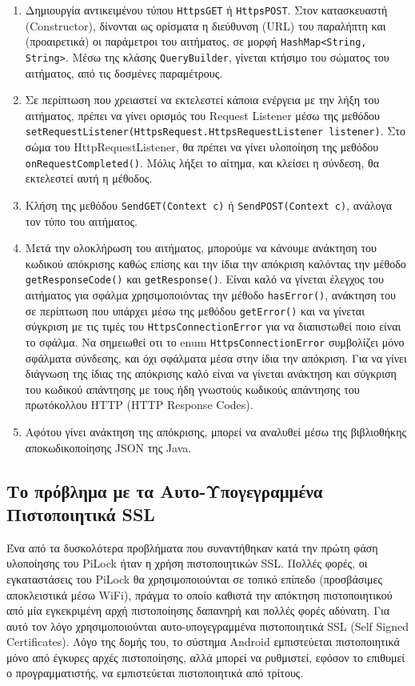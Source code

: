 	\begin{enumerate}
		\item Δημιουργία αντικειμένου τύπου \verb|HttpsGET| ή \verb|HttpsPOST|. Στον κατασκευαστή (Constructor), δίνονται ως ορίσματα η διεύθυνση (URL) του παραλήπτη και (προαιρετικά) οι παράμετροι του αιτήματος, σε μορφή \verb|HashMap<String, String>|. Μέσω της κλάσης \verb|QueryBuilder|, γίνεται κτήσιμο του σώματος του αιτήματος, από τις δοσμένες παραμέτρους.
		\item Σε περίπτωση που χρειαστεί να εκτελεστεί κάποια ενέργεια με την λήξη του αιτήματος, πρέπει να γίνει ορισμός του Request Listener μέσω της μεθόδου \verb|setRequestListener(HttpsRequest.HttpsRequestListener listener)|. Στο σώμα του HttpRequestListener, θα πρέπει να γίνει υλοποίηση της μεθόδου \verb|onRequestCompleted()|. Μόλις λήξει το αίτημα, και κλείσει η σύνδεση, θα εκτελεστεί αυτή η μέθοδος.
		\item Κλήση της μεθόδου \verb|SendGET(Context c)| ή \verb|SendPOST(Context c)|, ανάλογα τον τύπο του αιτήματος.
		\item Μετά την ολοκλήρωση του αιτήματος, μπορούμε να κάνουμε ανάκτηση του κωδικού απόκρισης καθώς επίσης και την ίδια την απόκριση καλόντας την μέθοδο \verb|getResponseCode()| και \verb|getResponse()|. Είναι καλό να γίνεται έλεγχος του αιτήματος για σφάλμα χρησιμοποιόντας την μέθοδο \verb|hasError()|, ανάκτηση του σε περίπτωση που υπάρχει μέσω της μεθόδου \verb|getError()| και να γίνεται σύγκριση με τις τιμές του \verb|HttpsConnectionError| για να διαπιστωθεί ποιο είναι το σφάλμα. Να σημειωθεί οτι το enum \verb|HttpsConnectionError| συμβολίζει μόνο σφάλματα σύνδεσης, και όχι σφάλματα μέσα στην ίδια την απόκριση. Για να γίνει διάγνωση της ίδιας της απόκρισης καλό είναι να γίνεται ανάκτηση και σύγκριση του κωδικού απάντησης με τους ήδη γνωστούς κωδικούς απάντησης του πρωτόκολλου HTTP (HTTP Response Codes).
		\item Αφότου γίνει ανάκτηση της απόκρισης, μπορεί να αναλυθεί μέσω της βιβλιοθήκης αποκωδικοποίησης JSON της Java.
	\end{enumerate}

	\subsection{Το πρόβλημα με τα Αυτο-Υπογεγραμμένα Πιστοποιητικά SSL}
		Ένα από τα δυσκολότερα προβλήματα που συναντήθηκαν κατά την πρώτη φάση υλοποίησης του PiLock ήταν η χρήση πιστοποιητικών SSL. Πολλές φορές, οι εγκαταστάσεις του PiLock θα χρησιμοποιούνται σε τοπικό επίπεδο (προσβάσιμες αποκλειστικά μέσω WiFi), πράγμα το οποίο καθιστά την απόκτηση πιστοποιητικού από μία εγκεκριμένη αρχή πιστοποίησης δαπανηρή και πολλές φορές αδύνατη. Για αυτό τον λόγο χρησιμοποιούνται αυτο-υπογεγραμμένα πιστοποιητικά SSL (Self Signed Certificates). Λόγο της δομής του, το σύστημα Android εμπιστεύεται πιστοποιητικά μόνο από έγκυρες αρχές πιστοποίησης, αλλά μπορεί να ρυθμιστεί, εφόσον το επιθυμεί ο προγραμματιστής, να εμπιστεύεται πιστοποιητικά από τρίτους. 

